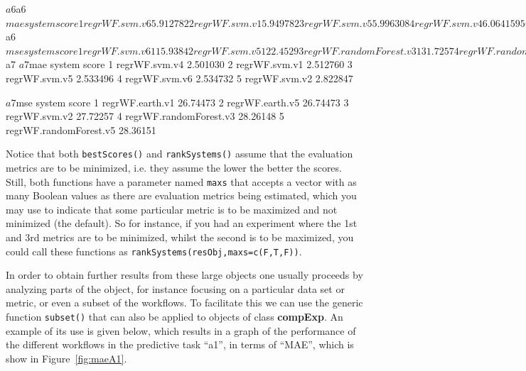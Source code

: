 \documentclass[10pt,a4paper]{article}
\begin{document}
\begin{Schunk}
\begin{Soutput}
$a6
$a6$mae
         system    score
1 regrWF.svm.v6 5.912782
2 regrWF.svm.v1 5.949782
3 regrWF.svm.v5 5.996308
4 regrWF.svm.v4 6.064159
5 regrWF.svm.v2 6.625542

$a6$mse
                  system    score
1          regrWF.svm.v6 115.9384
2          regrWF.svm.v5 122.4529
3 regrWF.randomForest.v3 131.7257
4 regrWF.randomForest.v5 132.0186
5 regrWF.randomForest.v1 132.4300


$a7
$a7$mae
         system    score
1 regrWF.svm.v4 2.501030
2 regrWF.svm.v1 2.512760
3 regrWF.svm.v5 2.533496
4 regrWF.svm.v6 2.534732
5 regrWF.svm.v2 2.822847

$a7$mse
                  system    score
1        regrWF.earth.v1 26.74473
2        regrWF.earth.v5 26.74473
3          regrWF.svm.v2 27.72257
4 regrWF.randomForest.v3 28.26148
5 regrWF.randomForest.v5 28.36151
\end{Soutput}
\end{Schunk}

Notice that both \texttt{bestScores()} and \texttt{rankSystems()}
assume that the evaluation metrics are to be minimized, i.e. they
assume the lower the better the scores. Still, both functions have a
parameter named \texttt{maxs} that accepts a vector with as many
Boolean values as there are evaluation metrics being estimated, which
you may use to indicate that some particular metric is to be maximized
and not minimized (the default). So for instance, if you had an
experiment where the 1st and 3rd metrics are to be minimized, whilst
the second is to be maximized, you could call these functions as
\texttt{rankSystems(resObj,maxs=c(F,T,F))}.

In order to obtain further results from these large objects one
usually proceeds by analyzing parts of the object, for instance
focusing on a particular data set or metric, or even a subset of the
workflows. To facilitate this we can use the generic function
\texttt{subset()} that can also be applied to objects of class
\textbf{compExp}. An example of its use is given below, which results
in a graph of the performance of the different workflows in the
predictive task ``a1'', in terms of ``MAE'', which is show in
Figure~\ref{fig:maeA1}.
\end{document}
